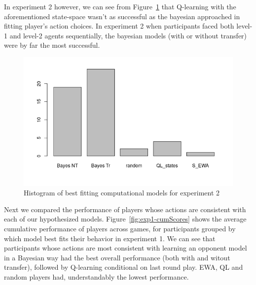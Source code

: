 \documentclass[man,floatsintext]{apa6}
\begin{document}
In experiment 2 however, we can see from Figure~\ref{fig:exp2-comp-models} that Q-learning with the aforementioned state-space wasn't as successful as the bayesian approached in fitting player's action choices. In experiment 2 when participants faced both level-1 and level-2 agents sequentially, the bayesian models (with or without transfer) were by far the most successful.

\begin{figure}

{\centering \includegraphics{../Report/images/exp2_comp_models} 

}

\caption{Histogram of best fitting computational models for experiment 2}\label{fig:exp2-comp-models}
\end{figure}

Next we compared the performance of players whose actions are consistent with each of our hypothesized models. Figure~\ref{fig:exp1-cumScores} shows the average cumulative performance of players across games, for participants grouped by which model best fits their behavior in experiment 1. We can see that participants whose actions are most consistent with learning an opponent model in a Bayesian way had the best overall performance (both with and witout transfer), followed by Q-learning conditional on last round play. EWA, QL and random players had, understandably the lowest performance.
\end{document}
